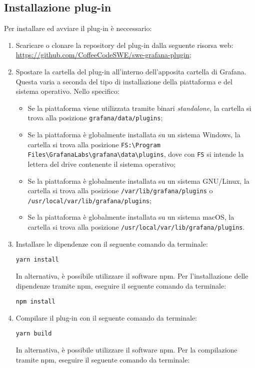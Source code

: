 \documentclass[../manuale-utente.tex]{subfiles}
\begin{document}
\subsection{Installazione plug-in}%
\label{subs:installazione-plug-in}
Per installare ed avviare il plug-in è neccessario:
\begin{enumerate}
    \item Scaricare o clonare la repository del plug-in dalla seguente risorsa web: \href{https://github.com/CoffeeCodeSWE/swe-grafana-plugin}{https://github.com/CoffeeCodeSWE/swe-grafana-plugin};
    \item Spostare la cartella del plug-in all'interno dell'apposita cartella di Grafana. Questa varia a seconda del tipo di installazione della piattaforma e del sistema operativo. Nello specifico:
    \begin{itemize}
      \item Se la piattaforma viene utilizzata tramite binari \textit{standalone}, la cartella si trova alla posizione \texttt{grafana/data/plugins};
      \item Se la piattaforma è globalmente installata su un sistema Windows, la cartella si trova alla posizione \texttt{FS:\textbackslash Program Files\textbackslash GrafanaLabs\textbackslash grafana\textbackslash data\textbackslash plugins}, dove con \texttt{FS} si intende la lettera del drive contenente il sistema operativo;
      \item Se la piattaforma è globalmente installata su un sistema GNU/Linux, la cartella si trova alla posizione \texttt{/var/lib/grafana/plugins} o \texttt{/usr/local/var/lib/grafana/plugins};
      \item Se la piattaforma è globalmente installata su un sistema macOS, la cartella si trova alla posizione \texttt{/usr/local/var/lib/grafana/plugins}.
    \end{itemize}
    \item Installare le dipendenze con il seguente comando da terminale:
    \\ \centerline{\texttt{yarn install}}
    In alternativa, è possibile utilizzare il software npm. Per l'installazione delle dipendenze tramite npm, eseguire il seguente comando da terminale:
    \\ \centerline{\texttt{npm install}}
    \item Compilare il plug-in con il seguente comando da terminale:
    \\ \centerline{\texttt{yarn build}}
    In alternativa, è possibile utilizzare il software npm. Per la compilazione tramite npm, eseguire il seguente comando da terminale:

\end{enumerate}
\end{document}
